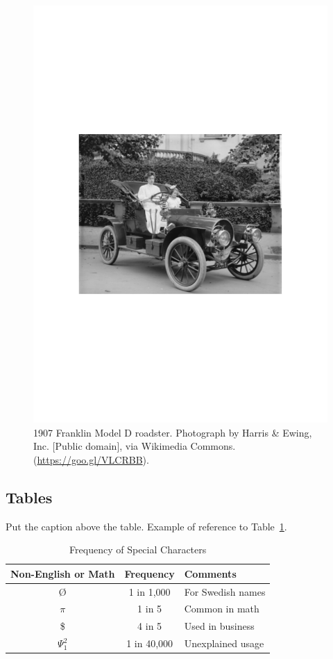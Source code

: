 \documentclass{ceurart}
\begin{document}
\begin{figure}
  \centering
  \includegraphics[width=0.8\linewidth]{figure/sample.pdf}
  \caption{1907 Franklin Model D roadster. Photograph by Harris \& Ewing, Inc. [Public domain], via Wikimedia Commons. (\url{https://goo.gl/VLCRBB}).}
  \label{fig:sample-figure}
\end{figure}

\subsection{Tables}

Put the caption above the table. Example of reference to Table~\ref{tab:sample-table}.

\begin{table}
  \caption{Frequency of Special Characters}
  \label{tab:sample-table}
  \centering
  \begin{tabular}{|c|c|l|}
    \toprule
    Non-English or Math&Frequency&Comments\\
    \midrule
    \O & 1 in 1,000& For Swedish names\\
    $\pi$ & 1 in 5& Common in math\\
    \$ & 4 in 5 & Used in business\\
    $\Psi^2_1$ & 1 in 40,000& Unexplained usage\\
  \bottomrule
\end{tabular}
\end{table}
\end{document}
